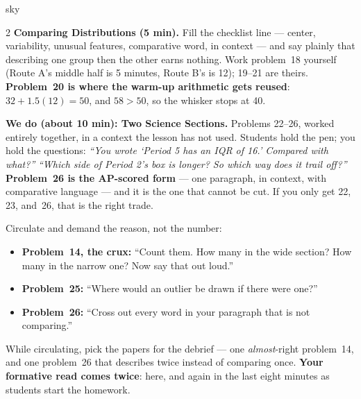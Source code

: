 \documentclass[10pt]{article}
\begin{document}
\begin{skillbox}{sky}
\begin{multicols}{2}
\columnbreak
\textbf{Comparing Distributions (5 min).} Fill the checklist line --- center, variability,
unusual features, comparative word, in context --- and say plainly that describing one group then
the other earns nothing. Work problem~18 yourself (Route A's middle half is 5 minutes, Route B's
is 12); 19--21 are theirs. \textbf{Problem~20 is where the warm-up arithmetic gets reused}:
$32 + 1.5(12) = 50$, and $58 > 50$, so the whisker stops at 40.

\textbf{We do (about 10 min): Two Science Sections.} Problems 22--26, worked entirely together,
in a context the lesson has not used. Students hold the pen; you hold the questions: \emph{``You
wrote `Period 5 has an IQR of 16.' Compared with what?''} \quad \emph{``Which side of Period 2's
box is longer? So which way does it trail off?''} \textbf{Problem~26 is the AP-scored form} --- one
paragraph, in context, with comparative language --- and it is the one that cannot be cut. If you
only get 22, 23, and~26, that is the right trade.

Circulate and demand the reason, not the number:
\begin{itemize}[leftmargin=1.1em, nosep]
  \item \textbf{Problem~14, the crux:} ``Count them. How many in the wide section? How many in
        the narrow one? Now say that out loud.''
  \item \textbf{Problem~25:} ``Where would an outlier be drawn if there were one?''
  \item \textbf{Problem~26:} ``Cross out every word in your paragraph that is not comparing.''
\end{itemize}
While circulating, pick the papers for the debrief --- one \emph{almost}-right problem~14, and
one problem~26 that describes twice instead of comparing once. \textbf{Your formative read comes
twice}: here, and again in the last eight minutes as students start the homework.
\end{multicols}
\end{skillbox}
\end{document}
